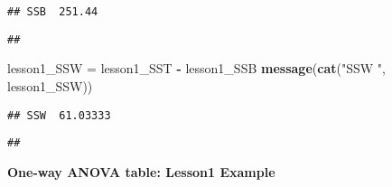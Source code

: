 \documentclass[]{book}
\newenvironment{Shaded}{\begin{snugshade}}{\end{snugshade}}
\newcommand{\DecValTok}[1]{\textcolor[rgb]{0.00,0.00,0.81}{#1}}
\newcommand{\KeywordTok}[1]{\textcolor[rgb]{0.13,0.29,0.53}{\textbf{#1}}}
\newcommand{\NormalTok}[1]{#1}
\newcommand{\OperatorTok}[1]{\textcolor[rgb]{0.81,0.36,0.00}{\textbf{#1}}}
\newcommand{\StringTok}[1]{\textcolor[rgb]{0.31,0.60,0.02}{#1}}
\theoremstyle{definition}
\theoremstyle{definition}
\theoremstyle{definition}
\theoremstyle{remark}
\begin{document}
\begin{Shaded}
\end{Shaded}

\begin{verbatim}
## SSB  251.44
\end{verbatim}

\begin{verbatim}
## 
\end{verbatim}

\begin{Shaded}
\begin{Highlighting}[]
\NormalTok{lesson1_SSW =}\StringTok{ }\NormalTok{lesson1_SST }\OperatorTok{-}\StringTok{ }\NormalTok{lesson1_SSB}
\KeywordTok{message}\NormalTok{(}\KeywordTok{cat}\NormalTok{(}\StringTok{"SSW "}\NormalTok{, lesson1_SSW))}
\end{Highlighting}
\end{Shaded}

\begin{verbatim}
## SSW  61.03333
\end{verbatim}

\begin{verbatim}
## 
\end{verbatim}

\textbf{One-way ANOVA table: Lesson1 Example}
\end{document}
